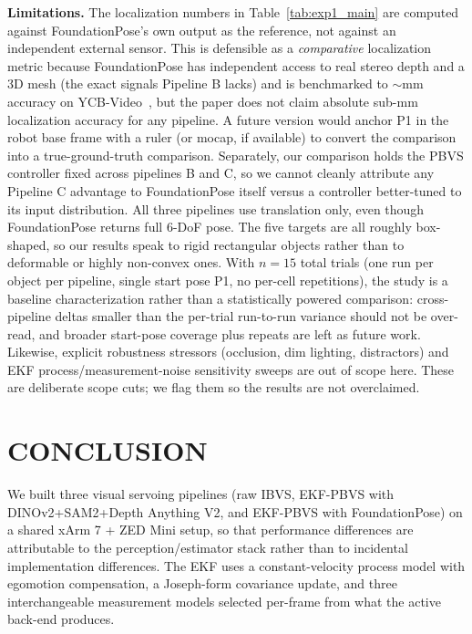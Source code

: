 \documentclass[letterpaper, 10 pt, conference]{ieeeconf}  %
\begin{document}
\textbf{Limitations.}
The localization numbers in Table~\ref{tab:exp1_main} are computed against FoundationPose's own output as the reference, not against an independent external sensor. This is defensible as a \emph{comparative} localization metric because FoundationPose has independent access to real stereo depth and a 3D mesh (the exact signals Pipeline B lacks) and is benchmarked to $\sim$mm accuracy on YCB-Video~\cite{foundationpose}, but the paper does not claim absolute sub-mm localization accuracy for any pipeline. A future version would anchor P1 in the robot base frame with a ruler (or mocap, if available) to convert the comparison into a true-ground-truth comparison. Separately, our comparison holds the PBVS controller fixed across pipelines B and C, so we cannot cleanly attribute any Pipeline C advantage to FoundationPose itself versus a controller better-tuned to its input distribution. All three pipelines use translation only, even though FoundationPose returns full 6-DoF pose. The five targets are all roughly box-shaped, so our results speak to rigid rectangular objects rather than to deformable or highly non-convex ones. With $n = 15$ total trials (one run per object per pipeline, single start pose P1, no per-cell repetitions), the study is a baseline characterization rather than a statistically powered comparison: cross-pipeline deltas smaller than the per-trial run-to-run variance should not be over-read, and broader start-pose coverage plus repeats are left as future work. Likewise, explicit robustness stressors (occlusion, dim lighting, distractors) and EKF process/measurement-noise sensitivity sweeps are out of scope here. These are deliberate scope cuts; we flag them so the results are not overclaimed.


\section{CONCLUSION}

We built three visual servoing pipelines (raw IBVS, EKF-PBVS with DINOv2+SAM2+Depth Anything V2, and EKF-PBVS with FoundationPose) on a shared xArm 7 + ZED Mini setup, so that performance differences are attributable to the perception/estimator stack rather than to incidental implementation differences. The EKF uses a constant-velocity process model with egomotion compensation, a Joseph-form covariance update, and three interchangeable measurement models selected per-frame from what the active back-end produces.
\end{document}
